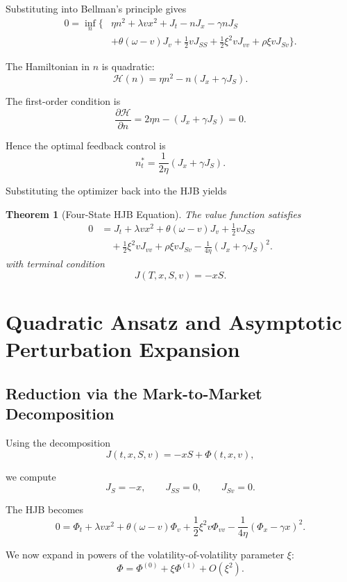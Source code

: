 \documentclass[11pt]{article}
\newtheorem{theorem}{Theorem}[section]
\begin{document}
Substituting into Bellman's principle gives
\begin{align*}
0
=
\inf_n
\Bigg\{
&\eta n^2
+
\lambda vx^2
+
J_t
-
nJ_x
-
\gamma nJ_S
\\
&+
\theta(\omega-v)J_v
+
\frac12vJ_{SS}
+
\frac12\xi^2vJ_{vv}
+
\rho\xi vJ_{Sv}
\Bigg\}.
\end{align*}

The Hamiltonian in $n$ is quadratic:
\[
\mathcal H(n)
=
\eta n^2
-
n(J_x+\gamma J_S).
\]

The first-order condition is
\[
\frac{\partial\mathcal H}{\partial n}
=
2\eta n-(J_x+\gamma J_S)=0.
\]

Hence the optimal feedback control is
\[
\boxed{
 n_t^*
 =
 \frac{1}{2\eta}
 \left(J_x+\gamma J_S\right)
 }.
\]

Substituting the optimizer back into the HJB yields
\begin{theorem}[Four-State HJB Equation]
The value function satisfies \cite{fleming2006controlled}
\[
\boxed{
\begin{aligned}
0
&=
J_t
+
\lambda vx^2
+
\theta(\omega-v)J_v
+
\frac12vJ_{SS}
\\
&\quad
+
\frac12\xi^2vJ_{vv}
+
\rho\xi vJ_{Sv}
-
\frac{1}{4\eta}(J_x+\gamma J_S)^2.
\end{aligned}
}
\]
with terminal condition
\[
J(T,x,S,v)=-xS.
\]
\end{theorem}

\section{Quadratic Ansatz and Asymptotic Perturbation Expansion}

\subsection{Reduction via the Mark-to-Market Decomposition}

Using the decomposition
\[
J(t,x,S,v)=-xS+\Phi(t,x,v),
\]

\cite{fouque2011multiscale}

we compute
\[
J_S=-x,
\qquad
J_{SS}=0,
\qquad
J_{Sv}=0.
\]

The HJB becomes
\[
0
=
\Phi_t
+
\lambda vx^2
+
\theta(\omega-v)\Phi_v
+
\frac12\xi^2v\Phi_{vv}
-
\frac{1}{4\eta}(\Phi_x-\gamma x)^2.
\]

We now expand in powers of the volatility-of-volatility parameter $\xi$:
\[
\Phi
=
\Phi^{(0)}
+
\xi\Phi^{(1)}
+
O(\xi^2).
\]
\end{document}
